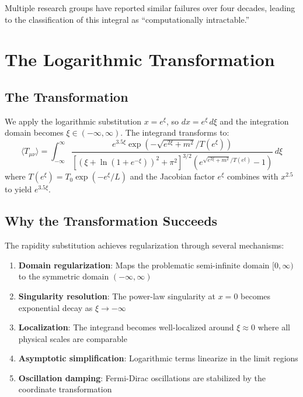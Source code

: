 \documentclass[12pt]{article}
\begin{document}
Multiple research groups have reported similar failures over four decades, leading to the classification of this integral as ``computationally intractable.''

\section{The Logarithmic Transformation}

\subsection{The Transformation}

We apply the logarithmic substitution $x = e^{\xi}$, so $dx = e^{\xi} \, d\xi$ and the integration domain becomes $\xi \in (-\infty, \infty)$. The integrand transforms to:
\begin{equation}
\langle T_{\mu\nu} \rangle = \int_{-\infty}^{\infty} 
\frac{e^{3.5\xi} \exp\left(-\sqrt{e^{2\xi} + m^2}/T(e^{\xi})\right)}
     {\left[ (\xi + \ln(1 + e^{-\xi}))^2 + \pi^2 \right]^{3/2}
        \left( e^{\sqrt{e^{2\xi} + m^2}/T(e^{\xi})} - 1 \right)}
\, d\xi
\label{eq:rapidity_integral}
\end{equation}
where $T(e^{\xi}) = T_0 \exp(-e^{\xi}/L)$ and the Jacobian factor $e^{\xi}$ combines with $x^{2.5}$ to yield $e^{3.5\xi}$.

\subsection{Why the Transformation Succeeds}

The rapidity substitution achieves regularization through several mechanisms:

\begin{enumerate}[leftmargin=*]
\item \textbf{Domain regularization}: Maps the problematic semi-infinite domain $[0, \infty)$ to the symmetric domain $(-\infty, \infty)$
\item \textbf{Singularity resolution}: The power-law singularity at $x = 0$ becomes exponential decay as $\xi \to -\infty$
\item \textbf{Localization}: The integrand becomes well-localized around $\xi \approx 0$ where all physical scales are comparable
\item \textbf{Asymptotic simplification}: Logarithmic terms linearize in the limit regions
\item \textbf{Oscillation damping}: Fermi-Dirac oscillations are stabilized by the coordinate transformation
\end{enumerate}
\end{document}

